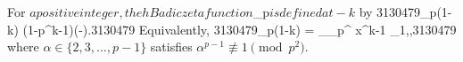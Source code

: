 For $ a positive integer, the hBadic zeta function $\zeta_p$ is defined at -k$ by
3130479\zeta_p(1-k) \equiv (1-p^{k-1})\left(-\right).3130479
Equivalently,
3130479\zeta_p(1-k) =  \int_{_p^\times} x^{k-1} \mu_{1,\alpha},3130479
where $\alpha \in \{2,3,\ldots,p-1\}$ satisfies $\alpha^{p-1} \not\equiv 1 \pmod{p^2}$.

